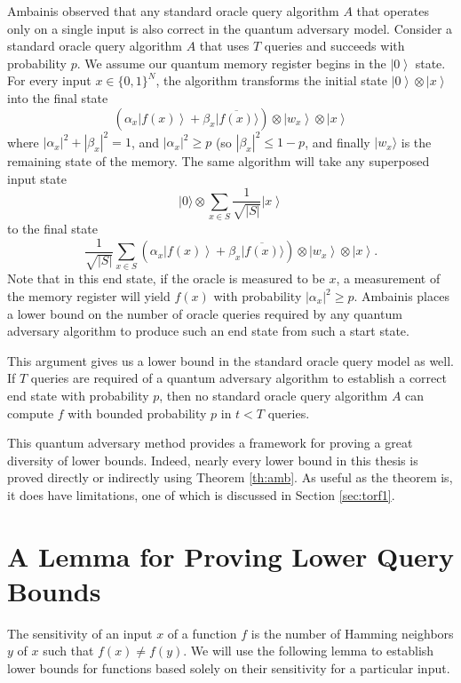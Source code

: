 Ambainis observed that any standard oracle query algorithm $A$ that
operates only on a single input is also correct in the quantum
adversary model.  Consider a standard oracle query algorithm $A$ that
uses $T$ queries and succeeds with probability $p$.  We assume our
quantum memory register begins in the $\left| 0 \right\rangle$ state.
For every input $x \in \{0,1\}^{N}$, the algorithm transforms the
initial state $\left| 0 \right\rangle \otimes \left| x \right\rangle$
into the final state
\[
\left(
  \alpha_{x}\left|f(x)\right\rangle
  +
  \beta_{x}|\overline{f(x)}\rangle
\right)
\otimes
\left|w_{x}\right\rangle
\otimes
\left|x\right\rangle
\]
where $|\alpha_{x}|^{2} + |\beta_{x}|^{2} = 1$, and $|\alpha_{x}|^{2}
\ge p$ (so $|\beta_{x}|^{2} \le 1-p$, and finally $|w_{x}\rangle$ is 
the remaining state of the memory. The same algorithm will take any
superposed input state
\[|0\rangle \otimes \sum_{x \in S} \frac{1}{\sqrt{\left|S\right|}} 
\left| x \right\rangle\]
to the final state
\[\frac{1}{\sqrt{|S|}} \sum_{x \in S} 
\left(
  \alpha_{x}\left|f(x)\right\rangle
  +
  \beta_{x}|\overline{f(x)}\rangle
\right)
\otimes
\left|w_{x}\right\rangle
\otimes
\left|x\right\rangle.
\]
Note that in this end state, if the oracle is measured to be $x$, a
measurement of the memory register will yield $f(x)$ with probability
$|\alpha_{x}|^{2} \ge p$.  Ambainis places a lower bound on the number of
oracle queries required by any quantum adversary algorithm to produce
such an end state from such a start state.

This argument gives us a lower bound in the standard oracle query
model as well.  If $T$ queries are required of a quantum adversary
algorithm to establish a correct end state with probability $p$, then
no standard oracle query algorithm $A$ can compute $f$ with bounded
probability $p$ in $t < T$ queries. 

This quantum adversary method provides a framework for proving a great
diversity of lower bounds.  Indeed, nearly every lower bound in this
thesis is proved directly or indirectly using Theorem \ref{th:amb}.
As useful as the theorem is, it does have limitations, one of which is
discussed in Section \ref{sec:torf1}.

\section{A Lemma for Proving Lower Query Bounds}
\label{sec:lplqb}

The sensitivity of an input $x$ of a function $f$ is the number of
Hamming neighbors $y$ of $x$ such that $f(x) \neq f(y)$.  We will use
the following lemma to establish lower bounds for functions based
solely on their sensitivity for a particular input.

